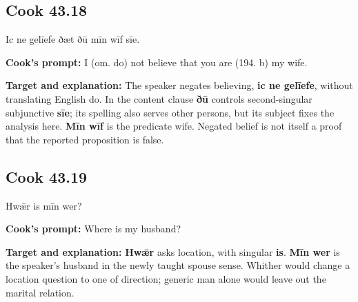 \par\begin{minipage}{\linewidth}\raggedright
\subsection*{Cook 43.18}

Ic ne gelīefe ðæt ðū mīn wīf sīe.

\textbf{Cook's prompt:} I (om. do) not believe that you are (194. b) my wife.

\textbf{Target and explanation:} The speaker negates believing, \textbf{ic ne gelīefe}, without translating English do. In the content clause \textbf{ðū} controls second-singular subjunctive \textbf{sīe}; its spelling also serves other persons, but its subject fixes the analysis here. \textbf{Mīn wīf} is the predicate wife. Negated belief is not itself a proof that the reported proposition is false.

\end{minipage}\par\addvspace{4pt}

\par\begin{minipage}{\linewidth}\raggedright
\subsection*{Cook 43.19}

Hwǣr is mīn wer?

\textbf{Cook's prompt:} Where is my husband?

\textbf{Target and explanation:} \textbf{Hwǣr} asks location, with singular \textbf{is}. \textbf{Mīn wer} is the speaker's husband in the newly taught spouse sense. Whither would change a location question to one of direction; generic man alone would leave out the marital relation.

\end{minipage}\par\addvspace{4pt}

